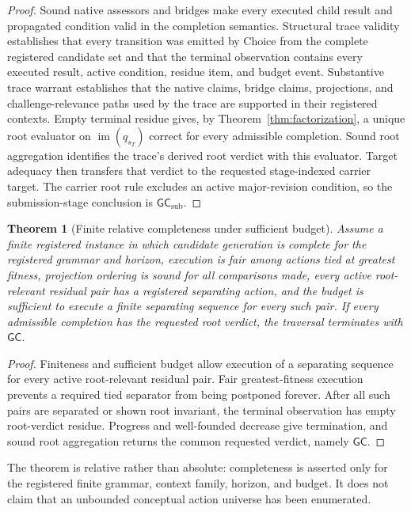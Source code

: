 \documentclass[10pt]{article}
\newtheorem{theorem}[definition]{Theorem}
\newcommand{\GC}{\mathsf{GC}}
\newcommand{\GCsub}{\mathsf{GC}_{\mathrm{sub}}}
\begin{document}
\begin{proof}
Sound native assessors and bridges make every executed child result and propagated condition valid in the completion semantics.  Structural trace validity establishes that every transition was emitted by Choice from the complete registered candidate set and that the terminal observation contains every executed result, active condition, residue item, and budget event.  Substantive trace warrant establishes that the native claims, bridge claims, projections, and challenge-relevance paths used by the trace are supported in their registered contexts.  Empty terminal residue gives, by Theorem~\ref{thm:factorization}, a unique root evaluator on $\operatorname{im}(q_{s_T})$ correct for every admissible completion.  Sound root aggregation identifies the trace's derived root verdict with this evaluator.  Target adequacy then transfers that verdict to the requested stage-indexed carrier target.  The carrier root rule excludes an active major-revision condition, so the submission-stage conclusion is $\GCsub$.
\end{proof}

\begin{theorem}[Finite relative completeness under sufficient budget]\label{thm:relative-completeness}
Assume a finite registered instance in which candidate generation is complete for the registered grammar and horizon, execution is fair among actions tied at greatest fitness, projection ordering is sound for all comparisons made, every active root-relevant residual pair has a registered separating action, and the budget is sufficient to execute a finite separating sequence for every such pair.  If every admissible completion has the requested root verdict, the traversal terminates with $\GC$.
\end{theorem}

\begin{proof}
Finiteness and sufficient budget allow execution of a separating sequence for every active root-relevant residual pair.  Fair greatest-fitness execution prevents a required tied separator from being postponed forever.  After all such pairs are separated or shown root invariant, the terminal observation has empty root-verdict residue.  Progress and well-founded decrease give termination, and sound root aggregation returns the common requested verdict, namely $\GC$.
\end{proof}

The theorem is relative rather than absolute: completeness is asserted only for the registered finite grammar, context family, horizon, and budget.  It does not claim that an unbounded conceptual action universe has been enumerated.
\end{document}

